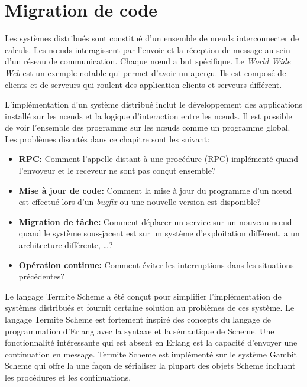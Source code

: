 \chapter{Migration de code}

Les systèmes distribués sont constitué d'un ensemble de nœuds interconnecter
de calculs. Les nœuds interagissent par l'envoie et la réception de message
au sein d'un réseau de communication. Chaque nœud a but spécifique. Le
\textit{World Wide Web} est un exemple notable qui permet d'avoir un aperçu.
Ils est composé de clients et de serveurs qui roulent des application
clients et serveurs différent.

L'implémentation d'un système distribué inclut le développement des applications
installé sur les nœuds et la logique d'interaction entre les nœuds. Il est
possible de voir l'ensemble des programme sur les nœuds comme un programme
global. Les problèmes discutés dans ce chapitre sont les suivant:

\begin{itemize}

  \item {\bf RPC:} Comment l'appelle distant à une procédure (RPC)
    implémenté quand l'envoyeur et le receveur ne sont pas conçut
    ensemble?

  \item {\bf Mise à jour de code:} Comment la mise à jour du programme d'un
    nœud est effectué lors d'un \textit{bugfix} ou une nouvelle
    version est disponible?

  \item {\bf Migration de tâche:} Comment déplacer un service sur un nouveau
    nœud quand le système sous-jacent est sur un système d'exploitation
    différent, a un architecture différente, \dots?

  \item {\bf Opération continue:} Comment éviter les interruptions dans les
    situations précédentes?

\end{itemize}

Le langage Termite Scheme\cite{DBLP:conf/erlang/Germain06} a été conçut
pour simplifier l'implémentation de systèmes distribués et fournit
certaine solution au problèmes de ces système. Le langage Termite Scheme est
fortement inspiré des concepts du langage de programmation d'Erlang avec la
syntaxe et la sémantique de Scheme. Une fonctionnalité intéressante qui est
absent en Erlang est la capacité d'envoyer une continuation en message.
Termite Scheme est implémenté sur le système Gambit Scheme qui offre la
une façon de sérialiser la plupart des objets Scheme incluant les
procédures et les continuations.

